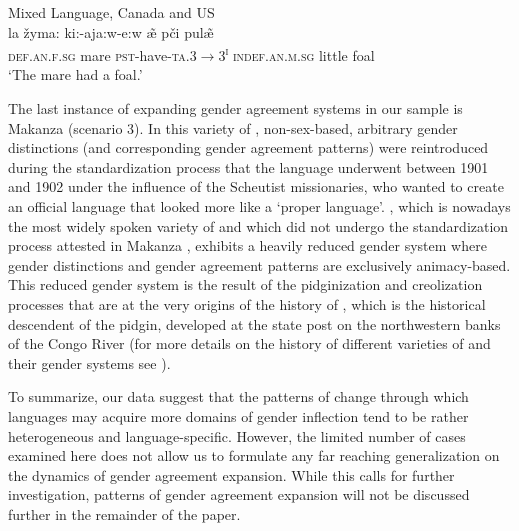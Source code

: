 \documentclass[output=collectionpaper]{langsci/langscibook}
\begin{document}
\ea\label{ex:dgm:10:Michif}
 {Mixed Language, Canada and US} {\citealt[87]{Bakker1997}}\\
\gll la \v{z}yma: ki:-aja:w-e:w \~{\ae} p\v{c}i pul\~{\ae} \\
\textsc{def.an.f.sg} mare \textsc{pst-}have-\textsc{ta.3$ \rightarrow $3\textsuperscript{i}} \textsc{indef.an.m.sg} little foal \\
\glt `The mare had a foal.'
\z


The last instance of expanding gender agreement systems in our sample is Makanza  (scenario 3). In this variety of , non-sex-based, arbitrary gender distinctions (and corresponding gender agreement patterns) were reintroduced during the standardization process that the language underwent between 1901 and 1902 under the influence of the Scheutist missionaries, who wanted to create an official language that looked more like a `proper  language'. , which is nowadays the most widely spoken variety of  and which did not undergo the standardization process attested in Makanza , exhibits a heavily reduced gender system where gender distinctions and gender agreement patterns are exclusively animacy-based. This reduced gender system is the result of the pidginization and creolization processes that are at the very origins of the history of , which is the historical descendent of the  pidgin, developed at the  state post on the northwestern banks of the Congo River (for more details on the history of different varieties of  and their gender systems see \citealt{Bokamba1977,DiGarbo2016,Meeuwis2013}).

To summarize, our data suggest that the patterns of change through which languages may acquire more domains of gender inflection tend to be rather heterogeneous and language-specific. However, the limited number of cases examined here does not allow us to formulate any far reaching generalization on the dynamics of gender agreement expansion. While this calls for further investigation, patterns of gender agreement expansion will not be discussed further in the remainder of the paper.
\end{document}
